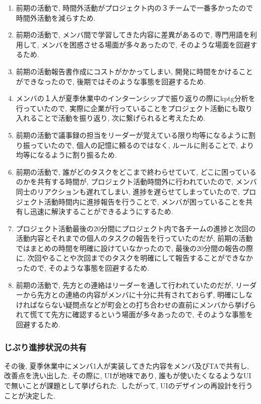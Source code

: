 \begin{enumerate}
    \item 前期の活動で, 時間外活動がプロジェクト内の３チームで一番多かったので時間外活動を減らすため.
    \item 前期の活動で, メンバ間で学習してきた内容に差異があるので, 専門用語を利用して, メンバを困惑させる場面が多々あったので, そのような場面を回避するため.
    \item 前期の活動報告書作成にコストがかかってしまい, 開発に時間をかけることができなったので, 後期ではそのような事態を回避するため.
    \item メンバの１人が夏季休業中のインターンシップで振り返りの際にkptg分析を行っていたので, 実際に企業が行っていることをプロジェクト活動にも取り入れることで活動を振り返り, 次に繋げられると考えたため.
    \item 前期の活動で議事録の担当をリーダーが覚えている限り均等になるように割り振っていたので, 個人の記憶に頼るのではなく, ルールに則ることで, より均等になるように割り振るため.
    \item 前期の活動で, 誰がどのタスクをどこまで終わらせていて, どこに困っているのかを共有する時間が, プロジェクト活動時間外に行われていたので, メンバ同士のリアクションも遅れてしまい, 進捗を遅らせてしまっていたので,
          プロジェクト活動時間内に進捗報告を行うことで, メンバが困っていることを共有し迅速に解決することができるようにするため.
    \item プロジェクト活動最後の20分間にプロジェクト内で各チームの進捗と次回の活動内容とそれまでの個人のタスクの報告を行っていたのだが, 前期の活動ではまとめの時間を明確に設けていなかったので,
          最後の20分間の報告の際に, 次回やることや次回までのタスクを明確にして報告することができなかったので, そのような事態を回避するため.
    \item 前期の活動で, 先方との連絡はリーダーを通して行われていたのだが, リーダーから先方との連絡の内容がメンバに十分に共有されておらず,
          明確にしなければならない疑問点などが町会との打ち合わせの直前にメンバから挙げられて慌てて先方に確認するという場面が多々あったので, そのような事態を回避するため.
\end{enumerate}

\subsubsection{じぷり進捗状況の共有}
その後, 夏季休業中にメンバ1人が実装してきた内容をメンバ及びTAで共有し, 改善点を洗い出した.
その際に, UIが地味であり, 誰もが使いたくなるようなUIで無いことが課題として挙げられた. したがって, UIのデザインの再設計を行うことが決定した.

